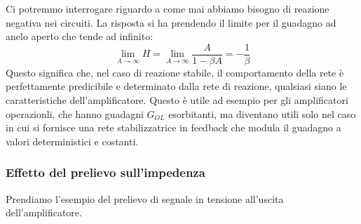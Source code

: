 \documentclass[a4paper,11pt]{article}
\begin{document}
Ci potremmo interrogare riguardo a come mai abbiamo bisogno di reazione negativa nei circuiti. La risposta si ha prendendo il limite per il guadagno ad anelo aperto che tende ad infinito:
$$
\lim_{A \rightarrow \infty} H = \lim_{A \rightarrow \infty} \frac{A}{1 - \beta A} = - \frac{1}{\beta}
$$
Questo significa che, nel caso di reazione stabile, il comportamento della rete è perfettamente predicibile e determinato dalla rete di reazione, qualsiasi siano le caratteristiche dell'amplificatore. Questo è utile ad esempio per gli amplificatori operazionli, che hanno guadagni $G_{OL}$ esorbitanti, ma diventano utili solo nel caso in cui si fornisce una rete stabilizzatrice in feedback che modula il guadagno a valori deterministici e costanti.

\subsubsection{Effetto del prelievo sull'impedenza}
Prendiamo l'esempio del prelievo di segnale in tensione all'uscita dell'amplificatore.

\begin{center}
\end{center}
\end{document}
